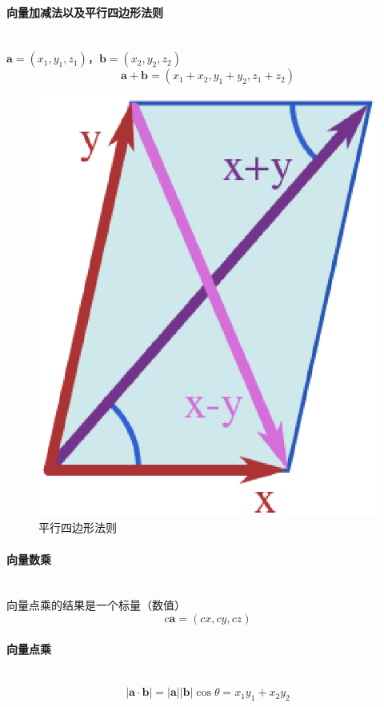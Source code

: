 \documentclass[a4paper, 11pt, oneside]{article}
\newcommand{\bol}[1]{\textbf{#1}}
\begin{document}
\paragraph{向量加减法以及平行四边形法则}\quad\\
\indent$\bol{a} = (x_1, y_1, z_1)$，$\bol{b} = (x_2, y_2, z_2)$
\begin{displaymath}
	\bol{a} + \bol{b} = (x_1 + x_2, y_1 + y_2, z_1 + z_2)
\end{displaymath}
\begin{figure}[!h]
\center
\includegraphics[scale=0.5]{./asset/parallelogram_law.eps}
\caption{平行四边形法则}
\end{figure}
\paragraph{向量数乘}\quad\\
\indent 向量点乘的结果是一个标量（数值）
\begin{displaymath}
	c\bol{a} = (cx, cy, cz)
\end{displaymath}
\paragraph{向量点乘}\quad\\
\begin{displaymath}
	\vert\bol{a}\cdot\bol{b}\vert = \vert \bol{a} \vert \vert \bol{b} \vert \cos{\theta} = x_1y_1 + x_2y_2
\end{displaymath}
\end{document}
